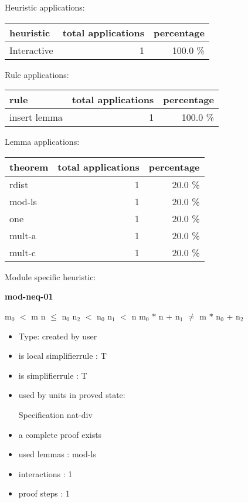 \documentclass[a4paper]{article}
\begin{document}
\medskip


Heuristic applications:

\begin{supertabular}{l|r|r}
heuristic	& total applications & percentage \\ \hline
Interactive & 1 & 100.0 \% \\

\end{supertabular}

Rule applications:

\begin{supertabular}{l|r|r}
rule	        & total applications & percentage \\ \hline
insert lemma & 1 & 100.0 \% \\

\end{supertabular}

Lemma applications:

\begin{supertabular}{l|r|r}
theorem	        & total applications & percentage \\ \hline
rdist & 1 & 20.0 \% \\
mod-ls & 1 & 20.0 \% \\
one & 1 & 20.0 \% \\
mult-a & 1 & 20.0 \% \\
mult-c & 1 & 20.0 \% \\

\end{supertabular}

Module specific heuristic:

\pagebreak

{\LARGE\bf mod-neq-01}\label{lemma-mod-neq-01}

\medskip

 \Fol $\mbox{m}_{0}$ $<$ m \And n $\le$ $\mbox{n}_{0}$ \And $\mbox{n}_{2}$ $<$ $\mbox{n}_{0}$ \And $\mbox{n}_{1}$ $<$ n \Imp $\mbox{m}_{0}$ $*$ n + $\mbox{n}_{1}$ $\neq$ m $*$ $\mbox{n}_{0}$ + $\mbox{n}_{2}$

\begin{itemize}

\item Type: created by user

\item is local simplifierrule : T
\item is simplifierrule : T
\item used by units in proved state:

Specification nat-div
\item       a complete proof exists
\item       used lemmas  : mod-ls
\item       interactions : 1
\item       proof steps  : 1
\end{itemize}
\end{document}
